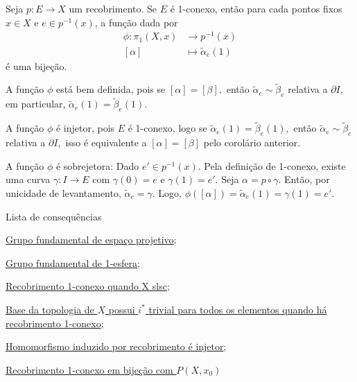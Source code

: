 \begin{corol}\label{cor:bijedeggene}
    Seja $p:E\rightarrow X$ um recobrimento. Se $E$ é 1-conexo, então para cada pontos fixos $x\in X$ e $e\in p^{-1}(x)$, a função dada por 
    \begin{align*}
        \phi:\pi_1(X,x)&\longrightarrow p^{-1}(x)\\
        [\alpha]&\longmapsto \tilde{\alpha}_{e}(1)
    \end{align*}
    é uma bijeção.
\end{corol}

\begin{dem}
    A função $\phi$ está bem definida, pois se $[\alpha]=[\beta],$ então $\tilde{\alpha}_{e}\sim \tilde{\beta}_{e}$ relativa a $\partial I,$ em particular, $\tilde{\alpha}_e(1)=\tilde{\beta}_e(1).$
    
    A função $\phi$ é injetor, pois $E$ é 1-conexo, logo se $\tilde{\alpha}_e(1)=\tilde{\beta}_e(1),$ então $\tilde{\alpha}_e \sim \tilde{\beta}_e$ relativa a $\partial I,$ isso é equivalente a $[\alpha]=[\beta]$ pelo corolário anterior.

    A função $\phi$ é sobrejetora: Dado $e'\in p^{-1}(x).$ Pela definição de 1-conexo, existe uma curva $\gamma:I\rightarrow E$ com $\gamma(0)=e$ e $\gamma(1)=e'.$ Seja $\alpha=p\circ \gamma.$ Então, por unicidade de levantamento, $\tilde{\alpha}_e=\gamma.$ Logo, $\phi([\alpha])=\tilde{\alpha}_e(1)=\gamma(1)=e'.$ 
\end{dem}

\begin{titlemize}{Lista de consequências}
	\item \hyperref[grupo-fundamental-de-espaco-projetivo-ex]{Grupo fundamental de espaço projetivo};\\ %
	\item \hyperref[grupo-fundamental-de-S1-prop]{Grupo fundamental de 1-esfera};\\
 	\item \hyperref[recobrimento-1-conexo-prop]{Recobrimento 1-conexo quando X slsc};\\
  	\item \hyperref[pertence-a-base-se-e-somente-se-possui-i-trivial]{Base da topologia de $X$ possui $i^*$ trivial para todos os elementos quando há recobrimento 1-conexo};\\
   	\item \hyperref[homomorfismo-induzido-por-recobrimento-prop]{Homomorfismo induzido por recobrimento é injetor};\\
    	\item \hyperref[recobrimento-1-conexo-em-bijecao-com-P(X,x)]{Recobrimento 1-conexo em bijeção com $P(X,x_0)$}
\end{titlemize}

